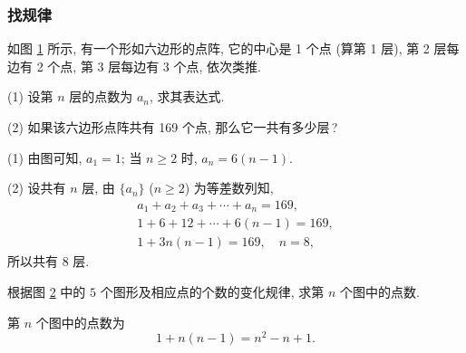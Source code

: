 \subsubsection{找规律}
\begin{example}
    如图 \ref{fig-190626-2000} 所示, 有一个形如六边形的点阵, 它的中心是 1 个点 (算第 1 层), 第 2 层每边有 2 个点, 
    第 3 层每边有 3 个点, 依次类推.
    
    (1) 设第 $n$ 层的点数为 $a_n$, 求其表达式.
    
    (2) 如果该六边形点阵共有 169 个点, 那么它一共有多少层\,?
\end{example}
\beginsolution
    (1) 由图可知, $a_1= 1$; 当 $n\geqslant 2$ 时, $a_n= 6(n-1)$.

    (2) 设共有 $n$ 层, 由 $\{a_n\}$ ($n\geqslant 2$) 为等差数列知,
    \[\begin{gathered}
        a_1+a_2+a_3+\cdots +a_n= 169,\\
        1+ 6+ 12+\cdots +6(n-1)= 169,\\
        1+ 3n(n-1)= 169,\quad n=8,
    \end{gathered}\]
    所以共有 $8$ 层.
\endsolution

    \begin{figure}[htb]
    \small
    \centering
    \caption{}\label{fig-190626-2000}
    \end{figure}
    
\lianxi
\begin{exercise}[s]
    根据图 \ref{fig-190626-2200} 中的 $5$ 个图形及相应点的个数的变化规律, 求第 $n$ 个图中的点数.
\end{exercise}
\beginsolution
    第 $n$ 个图中的点数为
    \[1+ n(n-1)= n^2-n+1.\]
\endsolution

    \begin{figure}[htb]
    \small
    \centering
    \caption{}\label{fig-190626-2200}
    \end{figure}

